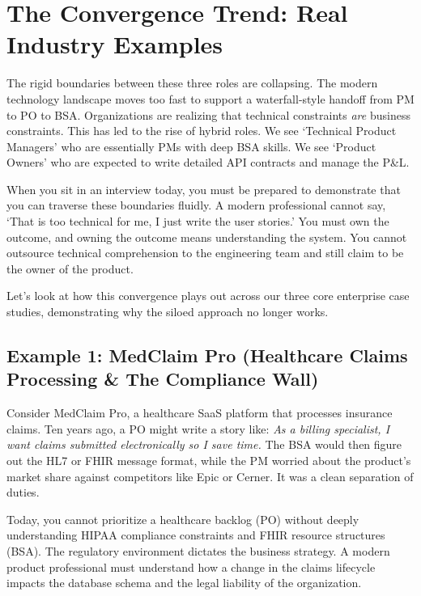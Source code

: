 \section{The Convergence Trend: Real Industry
Examples}\label{the-convergence-trend-real-industry-examples}

The rigid boundaries between these three roles are collapsing. The
modern technology landscape moves too fast to support a waterfall-style
handoff from PM to PO to BSA. Organizations are realizing that technical
constraints \emph{are} business constraints. This has led to the rise of
hybrid roles. We see `Technical Product Managers' who are essentially
PMs with deep BSA skills. We see `Product Owners' who are expected to
write detailed API contracts and manage the P\&L.

When you sit in an interview today, you must be prepared to demonstrate
that you can traverse these boundaries fluidly. A modern professional
cannot say, `That is too technical for me, I just write the user
stories.' You must own the outcome, and owning the outcome means
understanding the system. You cannot outsource technical comprehension
to the engineering team and still claim to be the owner of the product.

Let's look at how this convergence plays out across our three core
enterprise case studies, demonstrating why the siloed approach no longer
works.

\subsection{Example 1: MedClaim Pro (Healthcare Claims Processing \& The
Compliance
Wall)}\label{example-1-medclaim-pro-healthcare-claims-processing-the-compliance-wall}

Consider MedClaim Pro, a healthcare SaaS platform that processes
insurance claims. Ten years ago, a PO might write a story like: \emph{As
a billing specialist, I want claims submitted electronically so I save
time.} The BSA would then figure out the HL7 or FHIR message format,
while the PM worried about the product's market share against
competitors like Epic or Cerner. It was a clean separation of duties.

Today, you cannot prioritize a healthcare backlog (PO) without deeply
understanding HIPAA compliance constraints and FHIR resource structures
(BSA). The regulatory environment dictates the business strategy. A
modern product professional must understand how a change in the claims
lifecycle impacts the database schema and the legal liability of the
organization.

